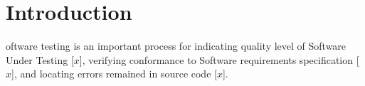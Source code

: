 \section{Introduction}

oftware testing is an important process for indicating quality level
of Software Under Testing [$x$], verifying conformance to Software requirements specification [$x$],
and locating errors remained in source code [$x$]. 
